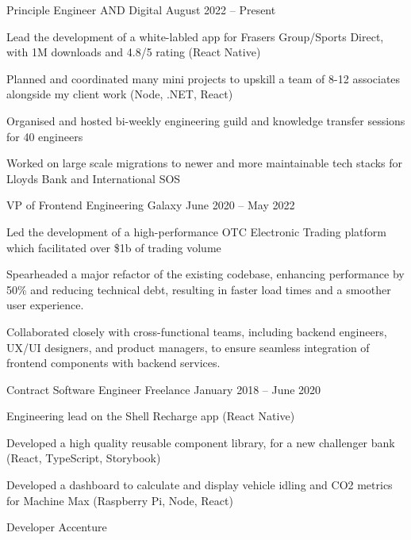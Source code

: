 \documentclass[]{awesome-cv}
\begin{document}
\begin{cventries}
    \cventry
    { Principle Engineer }
    { AND Digital }
    {}
    { August 2022 – Present }
    {\begin{cvitems}
        \item { Lead the development of a white-labled app for Frasers Group/Sports Direct, with 1M downloads and 4.8/5 rating (React Native) }
        \item { Planned and coordinated many mini projects to upskill a team of 8-12 associates alongside my client work (Node, .NET, React) }
        \item { Organised and hosted bi-weekly engineering guild and knowledge transfer sessions for 40 engineers }
        \item { Worked on large scale migrations to newer and more maintainable tech stacks for Lloyds Bank and International SOS }
    \end{cvitems}}
    \cventry
    { VP of Frontend Engineering }
    { Galaxy }
    {}
    { June 2020 – May 2022 }
    {\begin{cvitems}
        \item { Led the development of a high-performance OTC Electronic Trading platform which facilitated over \$1b of trading volume }
        \item { Spearheaded a major refactor of the existing codebase, enhancing performance by 50\% and reducing technical debt, resulting in faster load times and a smoother user experience. }
        \item { Collaborated closely with cross-functional teams, including backend engineers, UX/UI designers, and product managers, to ensure seamless integration of frontend components with backend services. }
    \end{cvitems}}
    \cventry
    { Contract Software Engineer }
    { Freelance }
    {}
    { January 2018 – June 2020 }
    {\begin{cvitems}
        \item { Engineering lead on the Shell Recharge app (React Native) }
        \item { Developed a high quality reusable component library, for a new challenger bank (React, TypeScript, Storybook) }
        \item { Developed a dashboard to calculate and display vehicle idling and CO2 metrics for Machine Max (Raspberry Pi, Node, React) }
    \end{cvitems}}
    \cventry
    { Developer }
    { Accenture }

\end{cventries}
\end{document}
